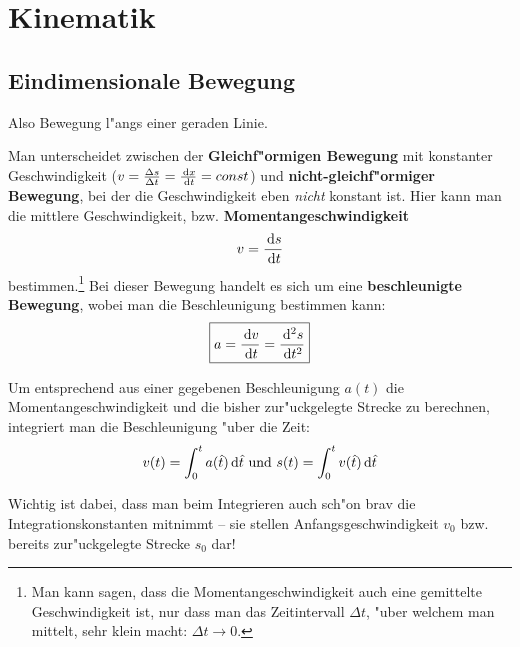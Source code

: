 \chapter{Kinematik}







\section{Eindimensionale Bewegung}
\label{kap_kinematik_eindimensional}

Also Bewegung l"angs einer geraden Linie.

Man unterscheidet zwischen der \textbf{Gleichf"ormigen
  Bewegung} mit konstanter
Geschwindigkeit ($v = \frac{\Delta s}{\Delta t} = \frac{\, \mathrm{d} x}{\, \mathrm{d}
  t}= const$) und \textbf{nicht-gleichf"ormiger Bewegung}, bei der die
Geschwindigkeit eben \emph{nicht} konstant ist. Hier kann man die
mittlere Geschwindigkeit,
bzw. \textbf{Momentangeschwindigkeit}
\begin{equation}
     v = \frac{\, \mathrm{d} s}{\, \mathrm{d} t}
\end{equation}
bestimmen.\footnote{Man kann sagen, dass die Momentangeschwindigkeit
  auch eine gemittelte Geschwindigkeit ist, nur dass man das
  Zeitintervall $\Delta t$, "uber welchem man mittelt, sehr klein
  macht: $\Delta t \to 0$.} Bei dieser Bewegung handelt es sich um
eine \textbf{beschleunigte Bewegung}, wobei man die Beschleunigung
bestimmen kann:
\begin{equation}
\boxed{
     a = \frac{\, \mathrm{d} v}{\, \mathrm{d} t} = \frac{\, \mathrm{d}^2 s}{\, \mathrm{d} t^2}
}
\end{equation}



Um entsprechend aus einer gegebenen Beschleunigung $a(t)$ die
Momentangeschwindigkeit und die bisher zur"uckgelegte Strecke zu
berechnen, integriert man die Beschleunigung "uber die Zeit:
\begin{equation}
   v(t) = \int_0^t a(\hat t) \, \mathrm{d} \hat t \text{ und } s(t) = 
   \int_0^t v(\hat t) \, \mathrm{d} \hat t
\end{equation}
\begin{Wichtig}
   Wichtig ist dabei, dass man beim Integrieren auch sch"on brav die
   Integrationskonstanten mitnimmt -- sie stellen
   Anfangsgeschwindigkeit $v_0$ bzw. bereits zur"uckgelegte Strecke
   $s_0$ dar!
\end{Wichtig}







